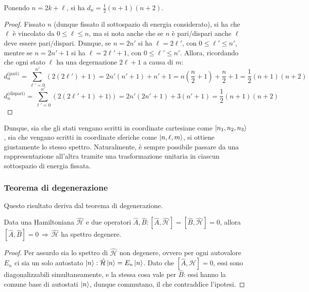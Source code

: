 \begin{proposition}
	Ponendo $ n = 2k + \ell $, si ha $ d_n = \frac{1}{2}(n + 1)(n + 2) $.
\end{proposition}
\begin{proof}
	Fissato $ n $ (dunque fissato il sottospazio di energia considerato), si ha che $ \ell $ è vincolato da $ 0 \le \ell \le n $, ma si nota anche che se $ n $ è pari/dispari anche $ \ell $ deve essere pari/dispari. Dunque, se $ n = 2n' $ si ha $ \ell = 2\ell' $, con $ 0 \le \ell' \le n' $, mentre se $ n = 2n' + 1 $ si ha $ \ell = 2\ell' + 1 $, con $ 0 \le \ell' \le n' $. Allora, ricordando che ogni stato $ \ell $ ha una degernazione $ 2\ell + 1 $ a causa di $ m $:
	\begin{equation*}
		d_n^{\text{(pari)}} = \sum_{\ell' = 0}^{n'} \left( 2(2\ell') + 1 \right) = 2 n' (n' + 1) + n' + 1 = n \left( \frac{n}{2} + 1 \right) + \frac{n}{2} + 1 = \frac{1}{2} (n + 1) (n + 2)
	\end{equation*}
	\begin{equation*}
		d_n^{\text{(dispari)}} = \sum_{\ell' = 0}^{n'} \left( 2 (2\ell' + 1) + 1) \right) = 2n' (2n' + 1) + 3 (n' + 1) = \frac{1}{2} (n + 1) (n + 2)
	\end{equation*}
\end{proof}

Dunque, sia che gli stati vengano scritti in coordinate cartesiane come $ \ket{n_1, n_2, n_3} $, sia che vengano scritti in coordinate sferiche come $ \ket{n,\ell,m} $, si ottiene giustamente lo stesso spettro. Naturalmente, è sempre possibile passare da una rappresentazione all'altra tramite una trasformazione unitaria in ciascun sottospazio di energia fissata.

\subsubsection{Teorema di degenerazione}

Questo risultato deriva dal teorema di degenerazione.

\begin{theorem}
	Data una Hamiltoniana $ \hat{\mathcal{H}} $ e due operatori $ \hat{A}, \hat{B} : [\hat{A},\hat{\mathcal{H}}] = [\hat{B},\hat{\mathcal{H}}] = 0 $, allora $ [\hat{A},\hat{B}] = 0 \,\Rightarrow\, \hat{\mathcal{H}} $ ha spettro degenere.
\end{theorem}
\begin{proof}
	Per assurdo sia lo spettro di $ \hat{\mathcal{H}} $ non degenere, ovvero per ogni autovalore $ E_n $ ci sia un solo autostato $ \ket{n} : \hat{\mathcal{H}}\ket{n} = E_n\ket{n} $. Dato che $ [\hat{A},\hat{\mathcal{H}}] = 0 $, essi sono diagonalizzabili simultaneamente, e la stessa cosa vale per $ \hat{B} $: essi hanno la comune base di autostati $ \ket{n} $, dunque commutano, il che contraddice l'ipotesi.
\end{proof}

